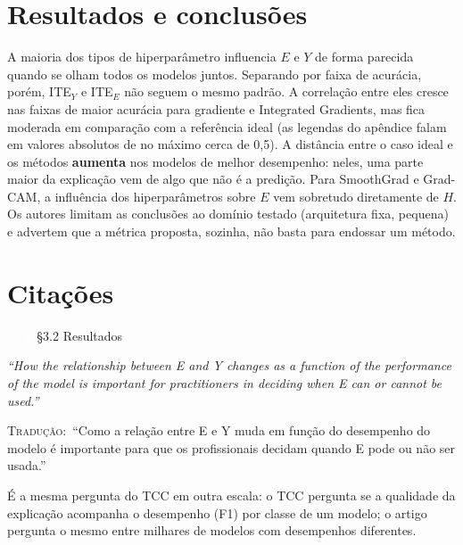 \documentclass[11pt,a4paper]{article}
\newcommand{\pagechip}[1]{{\setlength{\fboxsep}{1.5pt}\colorbox{cAcc}{\textcolor{white}{\scriptsize\texttt{#1}}}}}
\newenvironment{origquote}{\par\itshape\small}{\par}
\newenvironment{tradquote}{\par\small\textsc{Tradução:}\ }{\par}
\newcommand{\explab}[1]{\par\smallskip{\small\color{cAcc}\textbf{\MakeUppercase{#1}}}\par}
\begin{document}
\section{Resultados e conclusões}
A maioria dos tipos de hiperparâmetro influencia $E$ e $Y$ de forma parecida quando se olham todos os modelos juntos. Separando por faixa de acurácia, porém, ITE$_Y$ e ITE$_E$ não seguem o mesmo padrão. A correlação entre eles cresce nas faixas de maior acurácia para gradiente e Integrated Gradients, mas fica moderada em comparação com a referência ideal (as legendas do apêndice falam em valores absolutos de no máximo cerca de 0,5). A distância entre o caso ideal e os métodos \textbf{aumenta} nos modelos de melhor desempenho: neles, uma parte maior da explicação vem de algo que não é a predição. Para SmoothGrad e Grad-CAM, a influência dos hiperparâmetros sobre $E$ vem sobretudo diretamente de $H$. Os autores limitam as conclusões ao domínio testado (arquitetura fixa, pequena) e advertem que a métrica proposta, sozinha, não basta para endossar um método.

\section{Citações}

\begin{citacard}{\pagechip{p. 6} §3.2 Resultados}
\begin{origquote}“How the relationship between E and Y changes as a function of the performance of the model is important for practitioners in deciding when E can or cannot be used.”\end{origquote}
\begin{tradquote}“Como a relação entre E e Y muda em função do desempenho do modelo é importante para que os profissionais decidam quando E pode ou não ser usada.”\end{tradquote}
\explab{Explicação}
É a mesma pergunta do TCC em outra escala: o TCC pergunta se a qualidade da explicação acompanha o desempenho (F1) por classe de um modelo; o artigo pergunta o mesmo entre milhares de modelos com desempenhos diferentes.
\end{citacard}
\end{document}
